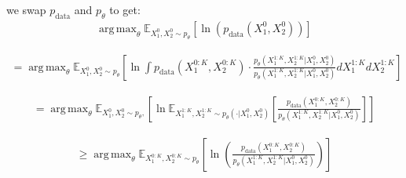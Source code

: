 \documentclass[11pt]{article}
\DeclareMathOperator*{\argmax}{arg\,max}
\begin{document}
we swap $p_{\text{data}}$ and $p_\theta$ to get:
\begin{align}
\argmax_\theta \mathbb{E}_{X_1^0, X_2^0 \sim p_\theta} \left[ \ln(p_{\text{data}}(X_1^0, X_2^0)) \right]
\end{align}

\begin{align}
= \argmax_\theta \mathbb{E}_{X_1^0, X_2^0 \sim p_\theta} \left[ \ln \int p_{\text{data}}(X_1^{0:K}, X_2^{0:K}) \cdot \frac{p_\theta(X_1^{1:K}, X_2^{1:K} | X_1^0, X_2^0)}{p_\theta(X_1^{1:K}, X_2^{1:K} | X_1^0, X_2^0)} dX_1^{1:K} dX_2^{1:K} \right]
\end{align}

\begin{align}
= \argmax_\theta \mathbb{E}_{X_1^0, X_2^0 \sim p_\theta, } \left[ \ln \mathbb{E}_{X_1^{1:K}, X_2^{1:K} \sim p_\theta(\cdot | X_1^0, X_2^0)} \left[ \frac{p_{\text{data}}(X_1^{0:K}, X_2^{0:K})}{p_\theta(X_1^{1:K}, X_2^{1:K} | X_1^0, X_2^0)} \right] \right]
\end{align}

\begin{align}
\geq \argmax_\theta \mathbb{E}_{X_1^{0:K}, X_2^{0:K} \sim p_\theta} \left[ \ln \left( \frac{p_{\text{data}}(X_1^{0:K}, X_2^{0:K})}{p_\theta(X_1^{1:K}, X_2^{1:K} | X_1^0, X_2^0)} \right) \right]
\end{align}
\end{document}
